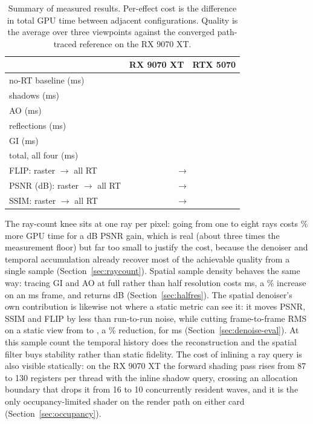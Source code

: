 \begin{table}[tbp]
\caption[Summary of measured results]{Summary of measured results. Per-effect cost is the difference
in total GPU time between adjacent configurations. Quality is the average over three viewpoints
against the converged path-traced reference on the RX 9070 XT.}
\label{tab:summary}
\centering
\begin{tabular}{lrr}
\toprule
 & RX 9070 XT & RTX 5070 \\
\midrule
no-RT baseline (ms)     & \perfBaseAMD{}        & \perfBaseNV{} \\
shadows (ms)            & \perfEffShadowsAMD{}  & \perfEffShadowsNV{} \\
AO (ms)                 & \perfEffAoAMD{}       & \perfEffAoNV{} \\
reflections (ms)        & \perfEffReflAMD{}     & \perfEffReflNV{} \\
GI (ms)                 & \perfEffGiAMD{}       & \perfEffGiNV{} \\
\midrule
total, all four (ms)    & \perfTotalAMD{}       & \perfTotalNV{} \\
\midrule
FLIP: raster $\rightarrow$ all RT  & \multicolumn{2}{c}{\qRasterFlip{} $\rightarrow$ \qAllRtFlip{}} \\
PSNR (dB): raster $\rightarrow$ all RT & \multicolumn{2}{c}{\qRasterPsnr{} $\rightarrow$ \qAllRtPsnr{}} \\
SSIM: raster $\rightarrow$ all RT  & \multicolumn{2}{c}{\qRasterSsim{} $\rightarrow$ \qAllRtSsim{}} \\
\bottomrule
\end{tabular}
\end{table}

The ray-count knee sits at one ray per pixel: going from one to eight rays costs \rcGpuPct\% more GPU
time for a \rcPsnrGain{} dB PSNR gain, which is real (about three times the measurement floor) but
far too small to justify the cost, because the
denoiser and temporal accumulation already recover most of the achievable quality from a single
sample (Section~\ref{sec:raycount}). Spatial sample density behaves the same way: tracing GI and AO
at full rather than half resolution costs \hrDeltaMs{} ms, a \hrDeltaPct\% increase on an
\hrHalfTotal{} ms frame, and returns \hrPsnrGain{} dB (Section~\ref{sec:halfres}). The spatial
denoiser's own contribution is likewise not where a static metric can see it: it moves PSNR, SSIM and
FLIP by less than run-to-run noise, while cutting frame-to-frame RMS on a static view from
\flickerOff{} to \flickerOn{}, a \flickerPct\% reduction, for \perfDenoiseAMD{} ms
(Section~\ref{sec:denoise-eval}). At this sample count the temporal history does the reconstruction
and the spatial filter buys stability rather than static fidelity. The cost of inlining a ray query
is also visible statically: on the RX 9070 XT the forward shading pass rises from 87 to 130 registers
per thread with the inline shadow query, crossing an allocation boundary that drops it from 16 to 10
concurrently resident waves, and it is the only occupancy-limited shader on the render path on either
card (Section~\ref{sec:occupancy}).

